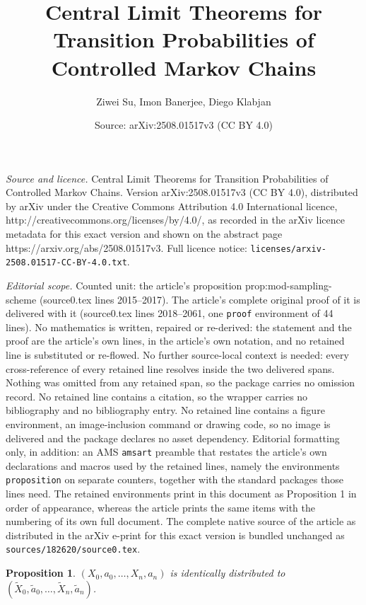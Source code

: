 \documentclass[10pt,a4paper]{amsart}
\title{Central Limit Theorems for Transition Probabilities of Controlled Markov Chains}
\author{Ziwei Su, Imon Banerjee, Diego Klabjan}
\date{Source: arXiv:2508.01517v3 (CC BY 4.0)}
\newtheorem{proposition}{Proposition}
\newcommand{\lp}{\left(}
\newcommand{\rp}{\right)}
\begin{document}
\maketitle

\noindent\emph{Source and licence.} Central Limit Theorems for Transition Probabilities of Controlled Markov Chains. Version arXiv:2508.01517v3 (CC BY 4.0), distributed by arXiv under the Creative Commons Attribution 4.0 International licence, http://creativecommons.org/licenses/by/4.0/, as recorded in the arXiv licence metadata for this exact version and shown on the abstract page https://arxiv.org/abs/2508.01517v3. Full licence notice: \texttt{licenses/arxiv-2508.01517-CC-BY-4.0.txt}.\par\smallskip

\noindent\textit{Editorial scope.} Counted unit: the article's proposition prop:mod-sampling-scheme (source0.tex lines 2015--2017). The article's complete original proof of it is delivered with it (source0.tex lines 2018--2061, one \texttt{proof} environment of 44 lines). No mathematics is written, repaired or re-derived: the statement and the proof are the article's own lines, in the article's own notation, and no retained line is substituted or re-flowed.  No further source-local context is needed: every cross-reference of every retained line resolves inside the two delivered spans.  Nothing was omitted from any retained span, so the package carries no omission record.  No retained line contains a citation, so the wrapper carries no bibliography and no bibliography entry.  No retained line contains a figure environment, an image-inclusion command or drawing code, so no image is delivered and the package declares no asset dependency.  Editorial formatting only, in addition: an AMS \texttt{amsart} preamble that restates the article's own declarations and macros used by the retained lines, namely the environments \texttt{proposition} on separate counters, together with the standard packages those lines need.  The retained environments print in this document as Proposition 1 in order of appearance, whereas the article prints the same items with the numbering of its own full document.  The complete native source of the article as distributed in the arXiv e-print for this exact version is bundled unchanged as \texttt{sources/182620/source0.tex}.
\begin{proposition}\label{prop:mod-sampling-scheme}
   $\lp X_0,a_0,\dots,X_n,a_n\rp$ is identically distributed to $\lp \tilde X_0,\tilde a_0,\dots,\tilde X_n,\tilde a_n\rp$.
\end{proposition}
\end{document}
